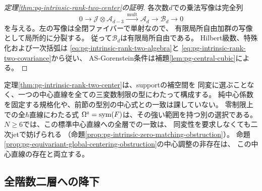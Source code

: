 \begin{proof}[定理\ref{thm:pg-intrinsic-rank-two-center}の証明]
各次数$d$での乗法写像は完全列
\begin{equation}
 0\longrightarrow\mathcal J\otimes\mathcal A_{d-3}
 \xrightarrow{\ \mathrm{mult}\ }\mathcal A_d
 \longrightarrow\mathcal B_d\longrightarrow0
 \label{eq:pg-intrinsic-rank-two-flat-quotient-sequence}
\end{equation}
を与える。左の写像は全閉ファイバーで単射なので、
有限局所自由加群の写像として局所的に分裂する。
従って$\mathcal B_d$は有限局所自由である。
Hilbert級数、特殊化および一次括弧は
\eqref{eq:pg-intrinsic-rank-two-algebra}と
\eqref{eq:pg-intrinsic-rank-two-covariance}から従い、
AS-Gorenstein条件は補題\ref{lem:pg-central-cubic}による。
\end{proof}

\begin{remark}[型別の選択と大域的選択]
\label{rem:pg-intrinsic-rank-two-choice}
定理\ref{thm:pg-intrinsic-rank-two-center}は、supportの補空間を
同変に選ぶことなく、一つの中心直線を全ての三変数制限の型にわたって構成する。
純中心係数を固定する規格化や、前節の型別の中心式との一致は課していない。
零制限上での全$\hbar$直線にわたる式
$\Omega^{\mathrm z}=\operatorname{sym}(F)$は、その強い範囲を持つ別の選択である。
$N\ge6$では、この標準中心直線への全層での一致は、
同変性を要求しなくても二次jetで妨げられる
（命題\ref{prop:pg-intrinsic-zero-matching-obstruction}）。
命題\ref{prop:pg-equivariant-global-centering-obstruction}の中心調整の非存在は、
この中心直線の存在と両立する。
\end{remark}

\subsection{全階数二層への降下}

